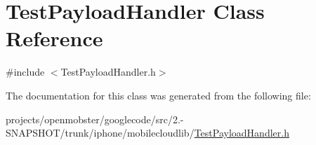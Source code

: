 \hypertarget{interface_test_payload_handler}{
\section{\-Test\-Payload\-Handler \-Class \-Reference}
\label{interface_test_payload_handler}
}


{\ttfamily \#include $<$\-Test\-Payload\-Handler.\-h$>$}



\-The documentation for this class was generated from the following file\-:\begin{DoxyCompactItemize}
\item 
projects/openmobster/googlecode/src/2.-\/\-S\-N\-A\-P\-S\-H\-O\-T/trunk/iphone/mobilecloudlib/\hyperlink{_test_payload_handler_8h}{\-Test\-Payload\-Handler.\-h}\end{DoxyCompactItemize}
